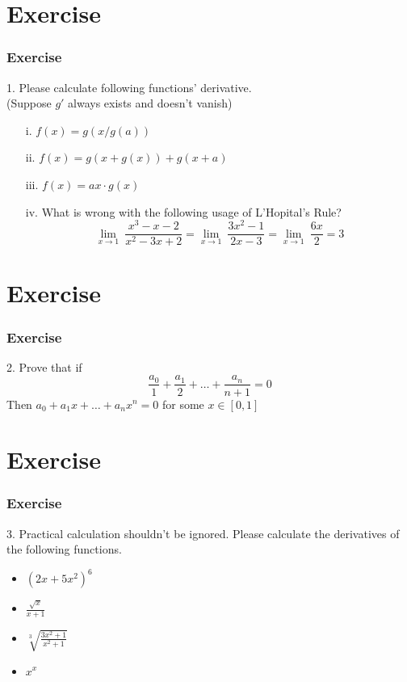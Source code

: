 \documentclass[12pt, t]{beamer}
\begin{document}
\section{Exercise}
\begin{frame}
    \frametitle{Exercise}
1. Please calculate following functions' derivative.\\(Suppose $g'$ always exists and doesn't vanish)
\begin{enumerate}
    \item[i.]   $f(x)=g(x/g(a))$
    \item[ii.]  $f(x)=g(x+g(x))+{g(x+a)}$ 
    \item[iii.] $f(x) =ax\cdot g(x)$
    \item[iv.]  What is wrong with the following usage of L'Hopital's Rule?\\
        \begin{equation*}
            \underset{x\rightarrow 1}{\lim}\ \frac{x^3-x-2}{x^2-3x+2}=\underset{x\rightarrow 1}{\lim}\ \frac{3x^2-1}{2x-3}=\underset{x\rightarrow 1}{\lim}\ \frac{6x}{2}=3
        \end{equation*}
\end{enumerate}
\end{frame}


\section{Exercise}
\begin{frame}
    \frametitle{Exercise}
2. Prove that if 
\begin{equation*}
    \frac{a_0}{1}+\frac{a_1}{2}+\dots+\frac{a_n}{n+1}=0
\end{equation*}
Then $a_0+a_1x+\dots+a_nx^n=0$ for some $x\in[0,1]$
\end{frame}


\section{Exercise}
\begin{frame}
    \frametitle{Exercise}
3. Practical calculation shouldn't be ignored. Please calculate the derivatives of the following functions.
\begin{itemize}
    \item $(2x+5x^2)^6$
    \vspace{0.3em}
    \item $\frac{\sqrt{x}}{x+1}$
    \vspace{0.3em}
    \item $\sqrt[3]{\frac{3x^2+1}{x^2+1}}$
    \vspace{0.3em}
    \item $x^{x}$
\end{itemize}
    
\end{frame}
\end{document}
